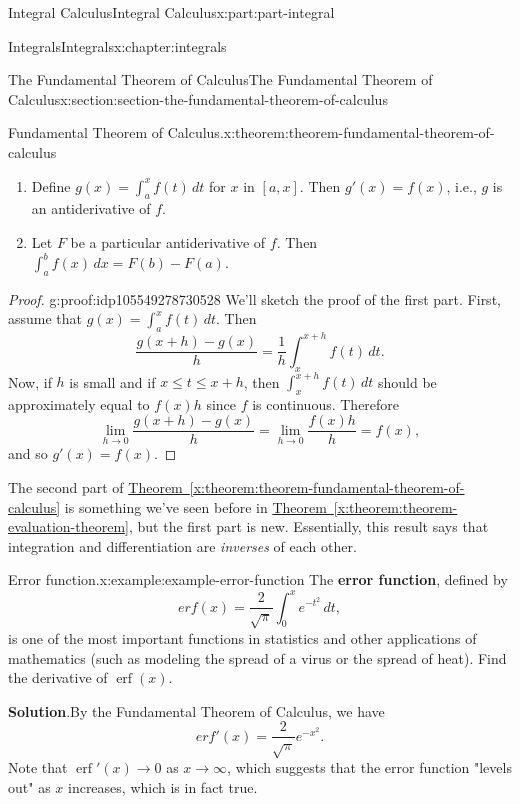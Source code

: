 \documentclass[twoside,10pt,]{book}
\newcommand{\blocktitlefont}{\relax}
\newcommand{\xreffont}{\relax}
\newcommand{\terminology}[1]{\textbf{#1}}
\numberwithin{equation}{part}
\newcommand{\erf}[1]{\operatorname{erf} #1}
\begin{document}
\begin{partptx}{Integral Calculus}{}{Integral Calculus}{}{}{x:part:part-integral}
\begin{chapterptx}{Integrals}{}{Integrals}{}{}{x:chapter:integrals}
\begin{sectionptx}{The Fundamental Theorem of Calculus}{}{The Fundamental Theorem of Calculus}{}{}{x:section:section-the-fundamental-theorem-of-calculus}
\begin{theorem}{Fundamental Theorem of Calculus.}{}{x:theorem:theorem-fundamental-theorem-of-calculus}
\begin{enumerate}
\item{}Define \(g(x) = \int_{a}^{x}f(t)\,dt\) for \(x\) in \([a,x]\). Then \(g'(x) = f(x)\), i.e., \(g\) is an antiderivative of \(f\).%
\item{}Let \(F\) be a particular antiderivative of \(f\). Then \(\int_{a}^{b}f(x)\,dx = F(b) - F(a).\)%
\end{enumerate}
\end{theorem}
\begin{proof}{}{g:proof:idp105549278730528}
We'll sketch the proof of the first part. First, assume that \(g(x) = \int_{a}^{x}f(t)\,dt\). Then%
\begin{equation*}
\frac{g(x+h)-g(x)}{h} = \frac{1}{h}\int_{x}^{x+h}f(t)\,dt.
\end{equation*}
Now, if \(h\) is small and if \(x\leq t\leq x+h\), then \(\int_{x}^{x+h}f(t)\,dt\) should be approximately equal to \(f(x)h\) since \(f\) is continuous. Therefore%
\begin{equation*}
\lim_{h\to0}\frac{g(x+h)-g(x)}{h} = \lim_{h\to0}\frac{f(x)h}{h} = f(x),
\end{equation*}
and so \(g'(x) = f(x)\).%
\end{proof}
The second part of \hyperref[x:theorem:theorem-fundamental-theorem-of-calculus]{Theorem~{\xreffont\ref{x:theorem:theorem-fundamental-theorem-of-calculus}}} is something we've seen before in \hyperref[x:theorem:theorem-evaluation-theorem]{Theorem~{\xreffont\ref{x:theorem:theorem-evaluation-theorem}}}, but the first part is new. Essentially, this result says that integration and differentiation are \emph{inverses} of each other.%
\begin{example}{Error function.}{x:example:example-error-function}%
The \terminology{error function}, defined by%
\begin{equation*}
erf(x) = \frac{2}{\sqrt{\pi}}\int_{0}^{x}e^{-t^{2}}\,dt,
\end{equation*}
is one of the most important functions in statistics and other applications of mathematics (such as modeling the spread of a virus or the spread of heat). Find the derivative of \(\erf(x)\).%
\par\smallskip%
\noindent\textbf{\blocktitlefont Solution}.\hypertarget{g:solution:idp105549278738208}{}\quad{}By the Fundamental Theorem of Calculus, we have%
\begin{equation*}
erf'(x) = \frac{2}{\sqrt{\pi}}e^{-x^{2}}.
\end{equation*}
Note that \(\erf'(x)\to0\) as \(x\to\infty\), which suggests that the error function "levels out" as \(x\) increases, which is in fact true.%

\end{example}
\end{sectionptx}
\end{chapterptx}
\end{partptx}
\end{document}
